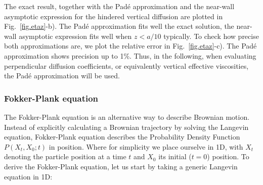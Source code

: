 The exact result, together with the Padé approximation and the near-wall asymptotic expression for the hindered vertical diffusion are plotted in Fig.~\ref{fig.etaz}-b). The Padé approximation fits well the exact solution, the near-wall asymptotic expression fits well when $z < a / 10$ typically. To check how precise both approximations are, we plot the relative error in Fig.~\ref{fig.etaz}-c). The Padé approximation shows precision up to 1\%. Thus, in the following, when evaluating perpendicular diffusion coefficients, or equivalently vertical effective viscosities, the Padé approximation will be used. 


%
%
%


\subsubsection{Fokker-Plank equation}

The Fokker-Plank equation is an alternative way to describe Brownian motion. Instead of explicitly calculating a Brownian trajectory by solving the Langevin equation, Fokker-Plank equation describes the Probability Density Function $P(X_t, X_0; t)$ in position. Where for simplicity we place ourselve in 1D, with $X_t$ denoting the particle position at a time $t$ and $X_0$ its initial ($t=0$) position. To derive the Fokker-Plank equation, let us start by taking a generic Langevin equation in 1D:

